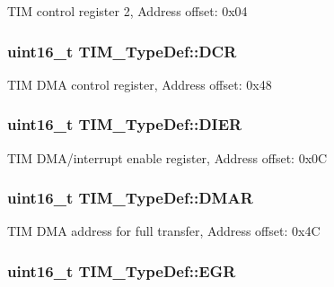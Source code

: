 T\-I\-M control register 2, Address offset\-: 0x04 \hypertarget{struct_t_i_m___type_def_ad3186a43824621f049e7eff37c88ad4e}{
\subsubsection[{D\-C\-R}]{ uint16\-\_\-t T\-I\-M\-\_\-\-Type\-Def\-::\-D\-C\-R}}\label{struct_t_i_m___type_def_ad3186a43824621f049e7eff37c88ad4e}
T\-I\-M D\-M\-A control register, Address offset\-: 0x48 \hypertarget{struct_t_i_m___type_def_a25b145e57a694bb384eee08fcd107c3a}{
\subsubsection[{D\-I\-E\-R}]{ uint16\-\_\-t T\-I\-M\-\_\-\-Type\-Def\-::\-D\-I\-E\-R}}\label{struct_t_i_m___type_def_a25b145e57a694bb384eee08fcd107c3a}
T\-I\-M D\-M\-A/interrupt enable register, Address offset\-: 0x0\-C \hypertarget{struct_t_i_m___type_def_a4e0fbb52e6dd4bdabcb3f3b2f4bae40c}{
\subsubsection[{D\-M\-A\-R}]{ uint16\-\_\-t T\-I\-M\-\_\-\-Type\-Def\-::\-D\-M\-A\-R}}\label{struct_t_i_m___type_def_a4e0fbb52e6dd4bdabcb3f3b2f4bae40c}
T\-I\-M D\-M\-A address for full transfer, Address offset\-: 0x4\-C \hypertarget{struct_t_i_m___type_def_a724fd21b7131fb9ac78c1b661dee3a8d}{
\subsubsection[{E\-G\-R}]{ uint16\-\_\-t T\-I\-M\-\_\-\-Type\-Def\-::\-E\-G\-R}}\label{struct_t_i_m___type_def_a724fd21b7131fb9ac78c1b661dee3a8d}

